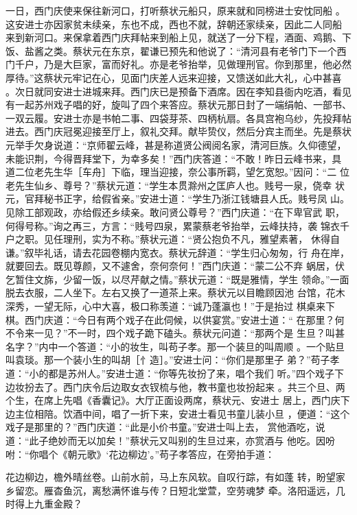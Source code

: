 一日，西门庆使来保往新河口，打听蔡状元船只，原来就和同榜进士安忱同船
。这安进士亦因家贫未续亲，东也不成，西也不就，辞朝还家续亲，因此二人同船
来到新河口。来保拿着西门庆拜帖来到船上见，就送了一分下程，酒面、鸡鹅、下
饭、盐酱之类。蔡状元在东京，翟谦已预先和他说了：“清河县有老爷门下一个西
门千户，乃是大巨家，富而好礼。亦是老爷抬举，见做理刑官。你到那里，他必然
厚待。”这蔡状元牢记在心，见面门庆差人远来迎接，又馈送如此大礼，心中甚喜
。次日就同安进士进城来拜。西门庆已是预备下酒席。因在李知县衙内吃酒，看见
有一起苏州戏子唱的好，旋叫了四个来答应。蔡状元那日封了一端绢帕、一部书、
一双云履。安进士亦是书帕二事、四袋芽茶、四柄杭扇。各具宫袍乌纱，先投拜帖
进去。西门庆冠冕迎接至厅上，叙礼交拜。献毕贽仪，然后分宾主而坐。先是蔡状
元举手欠身说道：“京师翟云峰，甚是称道贤公阀阅名家，清河巨族。久仰德望，
未能识荆，今得晋拜堂下，为幸多矣！”西门庆答道：“不敢！昨日云峰书来，具
道二位老先生华［车舟］下临，理当迎接，奈公事所羁，望乞宽恕。”因问：“二
位老先生仙乡、尊号？”蔡状元道：“学生本贯滁州之匡庐人也。贱号一泉，侥幸
状元，官拜秘书正字，给假省亲。”安进士道：“学生乃浙江钱塘县人氏。贱号凤
山。见除工部观政，亦给假还乡续亲。敢问贤公尊号？”西门庆道：“在下卑官武
职，何得号称。”询之再三，方言：“贱号四泉，累蒙蔡老爷抬举，云峰扶持，袭
锦衣千户之职。见任理刑，实为不称。”蔡状元道：“贤公抱负不凡，雅望素著，
休得自谦。”叙毕礼话，请去花园卷棚内宽衣。蔡状元辞道：“学生归心匆匆，行
舟在岸，就要回去。既见尊颜，又不遽舍，奈何奈何！”西门庆道：“蒙二公不弃
蜗居，伏乞暂住文旆，少留一饭，以尽芹献之情。”蔡状元道：“既是雅情，学生
领命。”一面脱去衣服，二人坐下。左右又换了一道茶上来。蔡状元以目瞻顾因池
台馆，花木深秀，一望无际，心中大喜，极口称羡道：“诚乃蓬瀛也！”于是抬过
棋桌来下棋。西门庆道：“今日有两个戏子在此伺候，以供宴赏。”安进士道：“
在那里？何不令来一见？”不一时，四个戏子跪下磕头。蔡状元问道：“那两个是
生旦？叫甚名字？”内中一个答道：“小的妆生，叫苟子孝。那一个装旦的叫周顺
。一个贴旦叫袁琰。那一个装小生的叫胡［忄造］。”安进士问：“你们是那里子
弟？”苟子孝道：“小的都是苏州人。”安进士道：“你等先妆扮了来，唱个我们
听。”四个戏子下边妆扮去了。西门庆令后边取女衣钗梳与他，教书童也妆扮起来
。共三个旦、两个生，在席上先唱《香囊记》。大厅正面设两席，蔡状元、安进士
居上，西门庆下边主位相陪。饮酒中间，唱了一折下来，安进士看见书童儿装小旦
，便道：“这个戏子是那里的？”西门庆道：“此是小价书童。”安进士叫上去，
赏他酒吃，说道：“此子绝妙而无以加矣！”蔡状元又叫别的生旦过来，亦赏酒与
他吃。因吩咐：“你唱个《朝元歌》‘花边柳边’。”苟子孝答应，在旁拍手道：

花边柳边，檐外晴丝卷。山前水前，马上东风软。自叹行踪，有如蓬
转，盼望家乡留恋。雁杳鱼沉，离愁满怀谁与传？日短北堂萱，空劳魂梦
牵。洛阳遥远，几时得上九重金殿？

